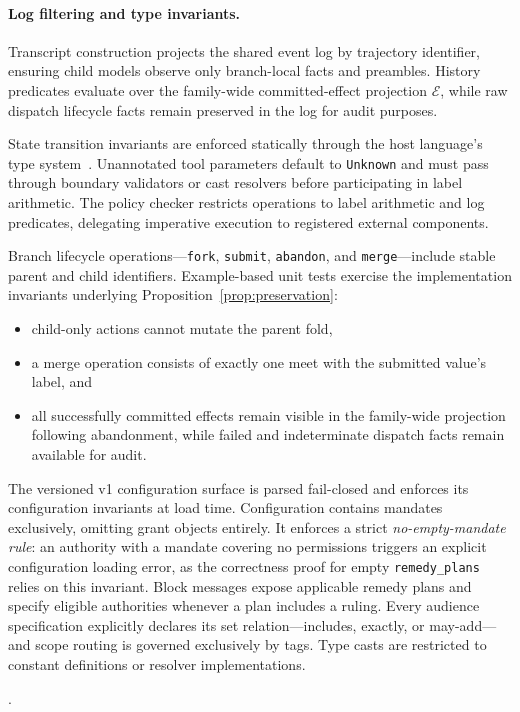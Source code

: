 \paragraph{Log filtering and type invariants.}
Transcript construction projects the shared event log by trajectory identifier, ensuring child models observe only branch-local facts and preambles. History predicates evaluate over the family-wide committed-effect projection $\mathcal{E}$, while raw dispatch lifecycle facts remain preserved in the log for audit purposes.

State transition invariants are enforced statically through the host language's type system~\cite{pierce2002types}. Unannotated tool parameters default to \texttt{Unknown} and must pass through boundary validators or cast resolvers before participating in label arithmetic. The policy checker restricts operations to label arithmetic and log predicates, delegating imperative execution to registered external components.

Branch lifecycle operations---\texttt{fork}, \texttt{submit}, \texttt{abandon}, and \texttt{merge}---include stable parent and child identifiers. Example-based unit tests exercise the implementation invariants underlying Proposition~\ref{prop:preservation}:
\begin{itemize}
  \item child-only actions cannot mutate the parent fold,
  \item a merge operation consists of exactly one meet with the submitted value's label, and
  \item all successfully committed effects remain visible in the family-wide projection following abandonment, while failed and indeterminate dispatch facts remain available for audit.
\end{itemize}

The versioned v1 configuration surface is parsed fail-closed and enforces its configuration invariants at load time. Configuration contains mandates exclusively, omitting grant objects entirely. It enforces a strict \emph{no-empty-mandate rule}: an authority with a mandate covering no permissions triggers an explicit configuration loading error, as the correctness proof for empty \texttt{remedy\_plans} relies on this invariant. Block messages expose applicable remedy plans and specify eligible authorities whenever a plan includes a ruling. Every audience specification explicitly declares its set relation---includes, exactly, or may-add---and scope routing is governed exclusively by tags. Type casts are restricted to constant definitions or resolver implementations.

.
